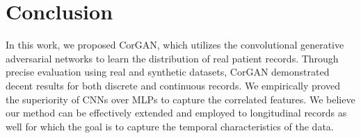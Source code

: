 \documentclass[letterpaper]{article} \usepackage{aaai20}  \usepackage{times}  \usepackage{helvet} \usepackage{courier}  \usepackage[hyphens]{url}  \usepackage{graphicx} \urlstyle{rm} \def\UrlFont{\rm}  \usepackage{graphicx}  \frenchspacing  \setlength{\pdfpagewidth}{8.5in}  \setlength{\pdfpageheight}{11in}
\begin{document}
\section{Conclusion}\label{sec:Conclusion}

In this work, we proposed CorGAN, which utilizes the convolutional generative adversarial networks to learn the distribution of real patient records. Through precise evaluation using real and synthetic datasets, CorGAN demonstrated decent results for both discrete and continuous records.  We empirically proved the superiority of CNNs over MLPs to capture the correlated features. We believe our method can be effectively extended and employed to longitudinal records as well for which the goal is to capture the temporal characteristics of the data.



\end{document}

